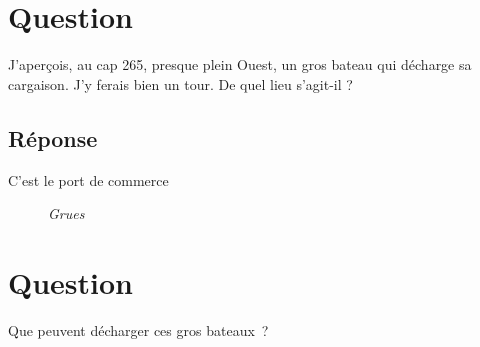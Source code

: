 \documentclass[12pt, report]{article}
\begin{document}
\section{Question}
J’aperçois, au cap 265,  presque plein Ouest, un gros bateau qui décharge sa cargaison. J’y ferais bien un tour. De quel lieu s'agit-il ?
\subsection*{Réponse}
C'est le port de commerce
\begin{center}
\begin{figure}[ht]
\caption{\textit{Grues}}
\end{figure}
\end{center}

\section{Question}
Que peuvent décharger ces gros bateaux ?
\end{document}
